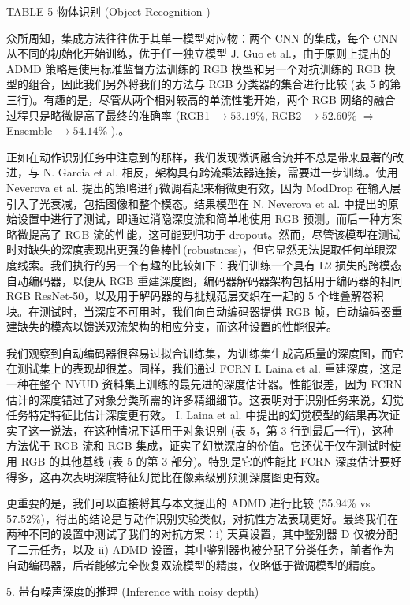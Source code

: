 TABLE 5
物体识别 (Object Recognition )


众所周知，集成方法往往优于其单一模型对应物：两个 CNN 的集成，每个 CNN 从不同的初始化开始训练，优于任一独立模型 J. Guo et al.，由于原则上提出的 ADMD 策略是使用标准监督方法训练的 RGB 模型和另一个对抗训练的 RGB 模型的组合，因此我们另外将我们的方法与 RGB 分类器的集合进行比较 (表 5 的第三行)。有趣的是，尽管从两个相对较高的单流性能开始，两个 RGB 网络的融合过程只是略微提高了最终的准确率 (RGB1 $\rightarrow 53.19 \%$, RGB2 $\rightarrow 52.60 \%$ $\Rightarrow$ Ensemble $\rightarrow 54.14 \%$ ).。

正如在动作识别任务中注意到的那样，我们发现微调融合流并不总是带来显著的改进，与 N. Garcia et al. 相反，架构具有跨流乘法器连接，需要进一步训练。使用 Neverova et al. 提出的策略进行微调看起来稍微更有效，因为 ModDrop 在输入层引入了光衰减，包括图像和整个模态。结果模型在  N. Neverova et al. 中提出的原始设置中进行了测试，即通过消隐深度流和简单地使用 RGB 预测。而后一种方案略微提高了 RGB 流的性能，这可能要归功于 dropout。然而，尽管该模型在测试时对缺失的深度表现出更强的鲁棒性(robustness)，但它显然无法提取任何单眼深度线索。我们执行的另一个有趣的比较如下：我们训练一个具有 L2 损失的跨模态自动编码器，以便从 RGB 重建深度图，编码器解码器架构包括用于编码器的相同 RGB ResNet-50，以及用于解码器的与批规范层交织在一起的 5 个堆叠解卷积块。在测试时，当深度不可用时，我们向自动编码器提供 RGB 帧，自动编码器重建缺失的模态以馈送双流架构的相应分支，而这种设置的性能很差。


我们观察到自动编码器很容易过拟合训练集，为训练集生成高质量的深度图，而它在测试集上的表现却很差。同样，我们通过 FCRN I. Laina et al. 重建深度，这是一种在整个 NYUD 资料集上训练的最先进的深度估计器。性能很差，因为 FCRN 估计的深度错过了对象分类所需的许多精细细节。这表明对于识别任务来说，幻觉任务特定特征比估计深度更有效。 I. Laina et al. 中提出的幻觉模型的结果再次证实了这一说法，在这种情况下适用于对象识别 (表 5，第 3 行到最后一行)，这种方法优于 RGB 流和 RGB 集成，证实了幻觉深度的价值。它还优于仅在测试时使用 RGB 的其他基线 (表 5 的第 3 部分)。特别是它的性能比 FCRN 深度估计要好得多，这再次表明深度特征幻觉比在像素级别预测深度图更有效。

更重要的是，我们可以直接将其与本文提出的 ADMD 进行比较 (55.94\% vs 57.52\%)，得出的结论是与动作识别实验类似，对抗性方法表现更好。最终我们在两种不同的设置中测试了我们的对抗方案：i) 天真设置，其中鉴别器 D 仅被分配了二元任务，以及 ii) ADMD 设置，其中鉴别器也被分配了分类任务，前者作为自动编码器，后者能够完全恢复双流模型的精度，仅略低于微调模型的精度。


5. 带有噪声深度的推理 (Inference with noisy depth)

